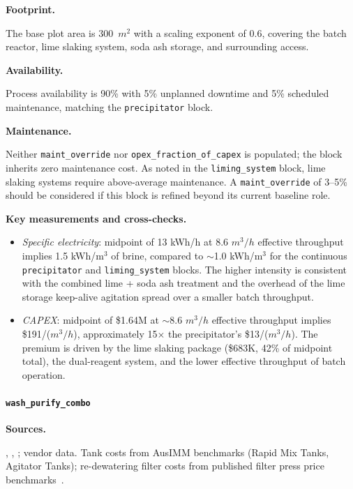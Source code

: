 \medskip
\noindent\textbf{Footprint.}\quad

The base plot area is 300~$\si{m^2}$ with a scaling exponent of 0.6, covering the batch reactor, lime slaking system, soda ash storage, and surrounding access.

\medskip
\noindent\textbf{Availability.}\quad

Process availability is 90\% with 5\% unplanned downtime and 5\% scheduled maintenance, matching the \texttt{precipitator} block.

\medskip
\noindent\textbf{Maintenance.}\quad

Neither \texttt{maint\_override} nor \texttt{opex\_fraction\_of\_capex} is populated; the block inherits zero maintenance cost. As noted in the \texttt{liming\_system} block, lime slaking systems require above-average maintenance. A \texttt{maint\_override} of 3--5\% should be considered if this block is refined beyond its current baseline role.

\medskip
\noindent\textbf{Key measurements and cross-checks.}\quad

\begin{itemize}[noitemsep]
	\item \textit{Specific electricity}: midpoint of 13 kWh/h at 8.6 $\si{m^3/h}$ effective throughput implies 1.5 kWh/m$^3$ of brine, compared to $\sim$1.0 kWh/m$^3$ for the continuous \texttt{precipitator} and \texttt{liming\_system} blocks. The higher intensity is consistent with the combined lime + soda ash treatment and the overhead of the lime storage keep-alive agitation spread over a smaller batch throughput.
	\item \textit{CAPEX}: midpoint of \$1.64M at $\sim$8.6 $\si{m^3/h}$ effective throughput implies \$191/($\si{m^3/h}$), approximately 15$\times$ the precipitator's \$13/($\si{m^3/h}$). The premium is driven by the lime slaking package (\$683K, 42\% of midpoint total), the dual-reagent system, and the lower effective throughput of batch operation.
\end{itemize}

\clearpage
\paragraph{\texttt{wash\_purify\_combo}}\label{app:04-methods-blockdefs-washpurify}

\medskip
\noindent\textbf{Sources.}\quad

\citet{srkconsultingSECTechnicalReport2023a}, \citet{sgscanadaincSK1300Technical2024}, \citet{petersPlantDesignEconomics1991}; vendor data. Tank costs from AusIMM benchmarks (Rapid Mix Tanks, Agitator Tanks); re-dewatering filter costs from published filter press price benchmarks~\citet{porvooIndustrialFilterPress2025}. 


